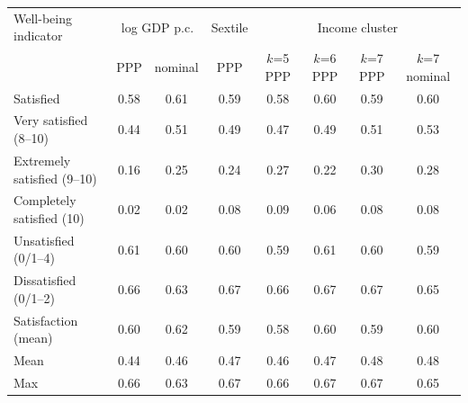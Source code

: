\begin{tabular}{lccccccc}
\toprule
Well-being indicator & \multicolumn{2}{c}{log GDP p.c.} & Sextile & \multicolumn{4}{c}{Income cluster} \\ & PPP & nominal & PPP & $k$=5 PPP & $k$=6 PPP & $k$=7 PPP & $k$=7 nominal \\
\midrule
Satisfied & 0.58 & 0.61 & 0.59 & 0.58 & 0.60 & 0.59 & 0.60 \\
Very satisfied (8--10) & 0.44 & 0.51 & 0.49 & 0.47 & 0.49 & 0.51 & 0.53 \\
Extremely satisfied (9--10) & 0.16 & 0.25 & 0.24 & 0.27 & 0.22 & 0.30 & 0.28 \\
Completely satisfied (10) & 0.02 & 0.02 & 0.08 & 0.09 & 0.06 & 0.08 & 0.08 \\
Unsatisfied (0/1--4) & 0.61 & 0.60 & 0.60 & 0.59 & 0.61 & 0.60 & 0.59 \\
Dissatisfied (0/1--2) & 0.66 & 0.63 & 0.67 & 0.66 & 0.67 & 0.67 & 0.65 \\
Satisfaction (mean) & 0.60 & 0.62 & 0.59 & 0.58 & 0.60 & 0.59 & 0.60 \\
\midrule
Mean & 0.44 & 0.46 & 0.47 & 0.46 & 0.47 & 0.48 & 0.48 \\
Max & 0.66 & 0.63 & 0.67 & 0.66 & 0.67 & 0.67 & 0.65 \\
\bottomrule
\end{tabular}
